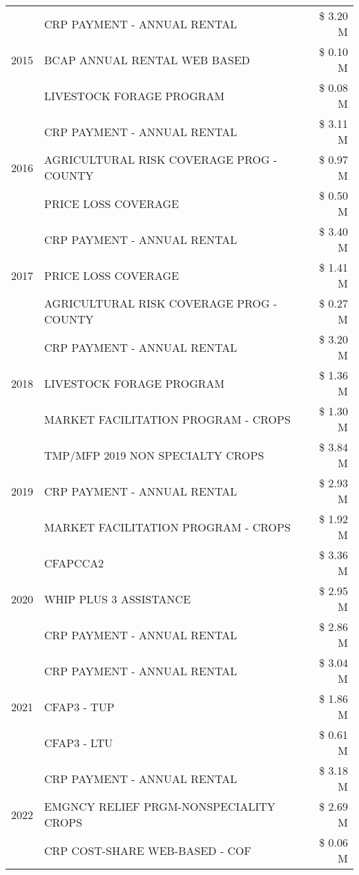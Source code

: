 \begin{tabular}{llr}
\cline{1-3}
\multirow[t]{3}{*}{2015} & CRP PAYMENT - ANNUAL RENTAL & \$ 3.20 M \\
 & BCAP ANNUAL RENTAL WEB BASED & \$ 0.10 M \\
 & LIVESTOCK FORAGE PROGRAM & \$ 0.08 M \\
\cline{1-3}
\multirow[t]{3}{*}{2016} & CRP PAYMENT - ANNUAL RENTAL & \$ 3.11 M \\
 & AGRICULTURAL RISK COVERAGE PROG - COUNTY & \$ 0.97 M \\
 & PRICE LOSS COVERAGE & \$ 0.50 M \\
\cline{1-3}
\multirow[t]{3}{*}{2017} & CRP PAYMENT - ANNUAL RENTAL & \$ 3.40 M \\
 & PRICE LOSS COVERAGE & \$ 1.41 M \\
 & AGRICULTURAL RISK COVERAGE PROG - COUNTY & \$ 0.27 M \\
\cline{1-3}
\multirow[t]{3}{*}{2018} & CRP PAYMENT - ANNUAL RENTAL & \$ 3.20 M \\
 & LIVESTOCK FORAGE PROGRAM & \$ 1.36 M \\
 & MARKET FACILITATION PROGRAM - CROPS & \$ 1.30 M \\
\cline{1-3}
\multirow[t]{3}{*}{2019} & TMP/MFP 2019 NON SPECIALTY CROPS & \$ 3.84 M \\
 & CRP PAYMENT - ANNUAL RENTAL & \$ 2.93 M \\
 & MARKET FACILITATION PROGRAM - CROPS & \$ 1.92 M \\
\cline{1-3}
\multirow[t]{3}{*}{2020} & CFAPCCA2 & \$ 3.36 M \\
 & WHIP PLUS 3 ASSISTANCE & \$ 2.95 M \\
 & CRP PAYMENT - ANNUAL RENTAL & \$ 2.86 M \\
\cline{1-3}
\multirow[t]{3}{*}{2021} & CRP PAYMENT - ANNUAL RENTAL & \$ 3.04 M \\
 & CFAP3 - TUP & \$ 1.86 M \\
 & CFAP3 - LTU & \$ 0.61 M \\
\cline{1-3}
\multirow[t]{3}{*}{2022} & CRP PAYMENT - ANNUAL RENTAL & \$ 3.18 M \\
 & EMGNCY RELIEF PRGM-NONSPECIALITY CROPS & \$ 2.69 M \\
 & CRP COST-SHARE WEB-BASED - COF & \$ 0.06 M \\
\cline{1-3}
\bottomrule
\end{tabular}
